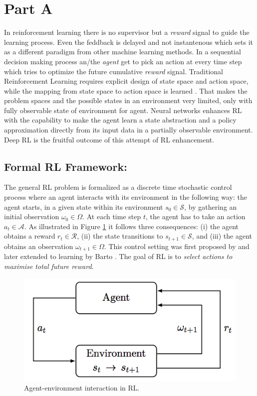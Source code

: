 \section{Part A}
\label{part_a}
In reinforcement learning there is no supervisor but a {\em reward} signal to guide the learning process. Even the feddback is delayed and not instantenous which sets it as a different paradigm from other machine learning methods. In a sequential decision making process an/the {\em agent} get to pick an action at every time step which tries to optimize the future cumulative {\em reward} signal.
Traditional Reinforcement Learning
requires explicit design of state space and action space, while the mapping from state space to action space is learned \cite{sutton1998introduction}.
 That makes the problem spaces and the possible states in an environment very limited, only with fully observable state of environment for agent.  Neural networks enhances RL with the capability to make the agent learn a state abstraction and a policy approximation directly from its input data in a partially observable environment. Deep RL is the fruitful outcome of this attempt of RL enhancement.

\subsection{Formal RL Framework:}
\label{formal_rl}
The general RL problem is formalized as a discrete time stochastic
control process where an agent interacts with its environment in the
following way: the agent starts, in a given state within its environment
$s_0 \in \mathcal{S}$, by gathering an initial observation $\omega_0 \in \Omega$. At each time
step $t$, the agent has to take an action $a_t \in \mathcal{A}$. As illustrated in
Figure \ref{fig:rl_01} it follows three consequences: (i) the agent obtains a reward
$r_t \in \mathcal{R}$, (ii) the state transitions to $s_{t+1} \in \mathcal{S}$, and (iii) the agent obtains
an observation $\omega_{t+1} \in \Omega$. This control setting was first proposed by
\cite{bellman1957dynamic} and later extended to learning by Barto \cite{barto1983neuronlike}.
The goal of RL is to {\em select actions to maximise total future reward}.
\begin{figure}[t]
	\includegraphics[width=0.7\linewidth ]{fig/agent.png}
    \vspace{-2mm}
    \caption{Agent-environment interaction in RL.}
    \label{fig:rl_01}
\end{figure}

